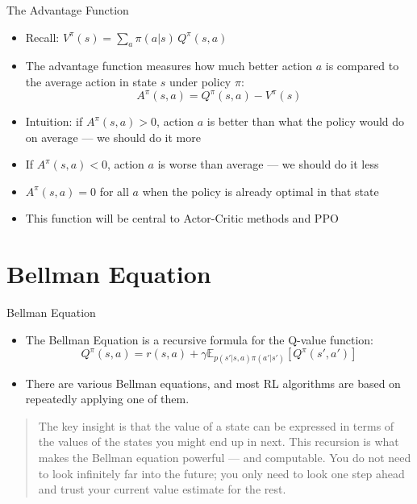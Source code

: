 \begin{frame}{The Advantage Function}
\begin{itemize}
    \item Recall: $V^{\pi}(s) = \sum_a \pi(a|s)\, Q^{\pi}(s,a)$
    \item The advantage function measures how much better action $a$ is compared to the average action in state $s$ under policy $\pi$:
    $$A^{\pi}(s,a) = Q^{\pi}(s,a) - V^{\pi}(s)$$
    \item Intuition: if $A^{\pi}(s,a) > 0$, action $a$ is better than what the policy would do on average --- we should do it more
    \item If $A^{\pi}(s,a) < 0$, action $a$ is worse than average --- we should do it less
    \item $A^{\pi}(s,a) = 0$ for all $a$ when the policy is already optimal in that state
    \item This function will be central to Actor-Critic methods and PPO
\end{itemize}
\end{frame}

\section{Bellman Equation}
\begin{frame}{Bellman Equation}
\begin{itemize}
    \item The Bellman Equation is a recursive formula for the Q-value function:
$$Q^{\pi}(s,a) =  r(s,a) + \gamma \mathbb{E}_{p(s'|s, a)\pi(a'|s')}\left [ Q^{\pi}(s',a') \right ]$$
    \item There are various Bellman equations, and most RL algorithms are based on repeatedly applying one of them.
\end{itemize}

\vspace{1em}
\begin{quote}
\small The key insight is that the value of a state can be expressed in terms of the values of the states you might end up in next. This recursion is what makes the Bellman equation powerful --- and computable. You do not need to look infinitely far into the future; you only need to look one step ahead and trust your current value estimate for the rest.
\end{quote}
    
\end{frame}

